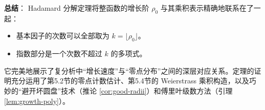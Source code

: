 \documentclass[UTF8]{ctexart}
\numberwithin{equation}{section}
\begin{document}
\textbf{总结}：
Hadamard 分解定理将整函数的增长阶 \(\rho_0\) 与其乘积表示精确地联系在了一起：
\begin{itemize}
\item 基本因子的次数可以全部取为 \(k = \lfloor \rho_0 \rfloor\)。
\item 指数部分是一个次数不超过 \(k\) 的多项式。
\end{itemize}
它完美地展示了复分析中“增长速度”与“零点分布”之间的深层对应关系。定理的证明充分运用了第5.2节的零点计数估计、第5.4节的 Weierstrass 乘积构造，以及巧妙的“避开坏圆盘”技术（推论 \ref{cor:good-radii}）和傅里叶级数方法（引理 \ref{lem:growth-poly}）。
\end{document}
